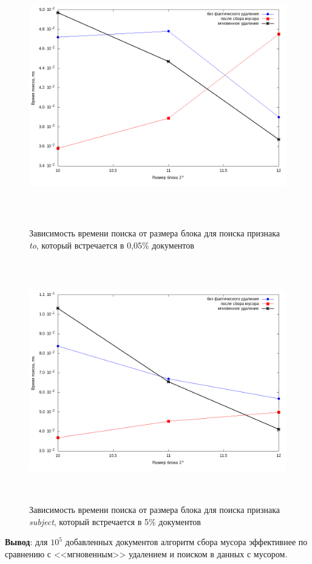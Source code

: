 \begin{figure}[H]
\includegraphics[width=\linewidth, height=10.5cm]{fig/limit_1/1e5/to.png}
\caption{Зависимость времени поиска от размера блока для поиска признака \textit{to}, который встречается в 0,05\% документов}
\includegraphics[width=\linewidth, height=10.5cm]{fig/limit_1/1e5/subject.png}
\caption{Зависимость времени поиска от размера блока для поиска признака \textit{subject}, который встречается в 5\% документов}
\end{figure}


\textbf{Вывод}: для $10^5$ добавленных документов алгоритм сбора мусора эффективнее
по сравнению с <<мгновенным>> удалением и поиском в данных с мусором.

